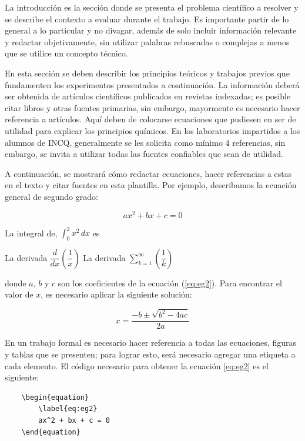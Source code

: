\documentclass[fleqn,10pt]{SelfArx} %
\begin{document}
La introducción es la sección donde se presenta el problema científico a resolver y se describe el contexto a evaluar durante el trabajo. Es importante partir de lo general a lo particular y no divagar, además de solo incluir información relevante y redactar objetivamente, sin utilizar palabras rebuscadas o complejas a menos que se utilice un concepto técnico.

En esta sección se deben describir los principios teóricos y trabajos previos que fundamenten los experimentos presentados a continuación. La información deberá ser obtenida de artículos científicos publicados en revistas indexadas; es posible citar libros y otras fuentes primarias, sin embargo, mayormente es necesario hacer referencia a artículos. Aquí deben de colocarse ecuaciones que pudiesen en ser de utilidad para explicar los principios químicos. En los laboratorios impartidos a los alumnos de INCQ, generalmente se les solicita como mínimo 4 referencias, sin embargo, se invita a utilizar todas las fuentes confiables que sean de utilidad.

A continuación, se mostrará cómo redactar ecuaciones, hacer referencias a estas en el texto y citar fuentes en esta plantilla. Por ejemplo, describamos la ecuación general de segundo grado:

\begin{equation}
    \label{eq:eg2}
    ax^2 + bx + c = 0
\end{equation}

La integral de, $\displaystyle \int_{0}^{2} x^2 \, dx$ es

La derivada $\dfrac{d}{dx} \left( \dfrac{1}{x} \right)$
La derivada $\displaystyle \sum_{k = 1}^{\infty} \left( \dfrac{1}{k} \right)$

\noindent donde $a$, $b$ y $c$ son los coeficientes de la ecuación (\ref{eq:eg2}). Para encontrar el valor de $x$, es necesario aplicar la siguiente solución:

\begin{equation}
    \label{eq:solucion}
    x = \displaystyle\frac{-b \pm \sqrt{b^2-4ac}}{2a}
\end{equation}

En un trabajo formal es necesario hacer referencia a todas las ecuaciones, figuras y tablas que se presenten; para lograr esto, será necesario agregar una etiqueta a cada elemento. El código necesario para obtener la ecuación \eqref{eq:eg2} es el siguiente:

\begin{verbatim}
    \begin{equation}
        \label{eq:eg2}
        ax^2 + bx + c = 0
    \end{equation}
\end{verbatim}
\end{document}

